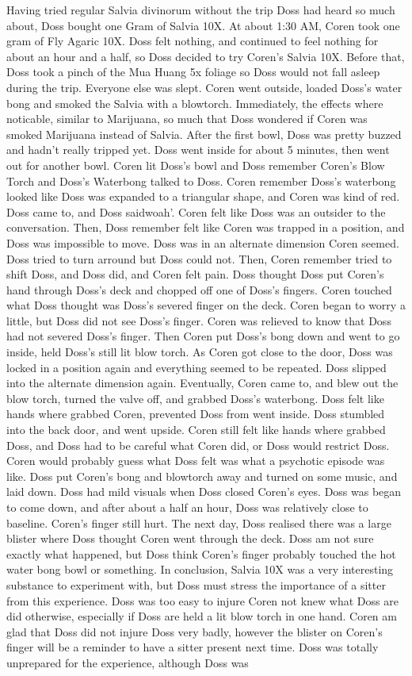 \documentclass[12pt]{book}
\begin{document}
Having tried regular Salvia divinorum without the trip Doss had heard so much about, Doss bought one Gram of Salvia 10X. At about 1:30 AM, Coren took one gram of Fly Agaric 10X. Doss felt nothing, and continued to feel nothing for about an hour and a half, so Doss decided to try Coren's Salvia 10X. Before that, Doss took a pinch of the Mua Huang 5x foliage so Doss would not fall asleep during the trip. Everyone else was slept. Coren went outside, loaded Doss's water bong and smoked the Salvia with a blowtorch. Immediately, the effects where noticable, similar to Marijuana, so much that Doss wondered if Coren was smoked Marijuana instead of Salvia. After the first bowl, Doss was pretty buzzed and hadn't really tripped yet. Doss went inside for about 5 minutes, then went out for another bowl. Coren lit Doss's bowl and Doss remember Coren's Blow Torch and Doss's Waterbong talked to Doss. Coren remember Doss's waterbong looked like Doss was expanded to a triangular shape, and Coren was kind of red. Doss came to, and Doss saidwoah'. Coren felt like Doss was an outsider to the conversation. Then, Doss remember felt like Coren was trapped in a position, and Doss was impossible to move. Doss was in an alternate dimension Coren seemed. Doss tried to turn arround but Doss could not. Then, Coren remember tried to shift Doss, and Doss did, and Coren felt pain. Doss thought Doss put Coren's hand through Doss's deck and chopped off one of Doss's fingers. Coren touched what Doss thought was Doss's severed finger on the deck. Coren began to worry a little, but Doss did not see Doss's finger. Coren was relieved to know that Doss had not severed Doss's finger. Then Coren put Doss's bong down and went to go inside, held Doss's still lit blow torch. As Coren got close to the door, Doss was locked in a position again and everything seemed to be repeated. Doss slipped into the alternate dimension again. Eventually, Coren came to, and blew out the blow torch, turned the valve off, and grabbed Doss's waterbong. Doss felt like hands where grabbed Coren, prevented Doss from went inside. Doss stumbled into the back door, and went upside. Coren still felt like hands where grabbed Doss, and Doss had to be careful what Coren did, or Doss would restrict Doss. Coren would probably guess what Doss felt was what a psychotic episode was like. Doss put Coren's bong and blowtorch away and turned on some music, and laid down. Doss had mild visuals when Doss closed Coren's eyes. Doss was began to come down, and after about a half an hour, Doss was relatively close to baseline. Coren's finger still hurt. The next day, Doss realised there was a large blister where Doss thought Coren went through the deck. Doss am not sure exactly what happened, but Doss think Coren's finger probably touched the hot water bong bowl or something. In conclusion, Salvia 10X was a very interesting substance to experiment with, but Doss must stress the importance of a sitter from this experience. Doss was too easy to injure Coren not knew what Doss are did otherwise, especially if Doss are held a lit blow torch in one hand. Coren am glad that Doss did not injure Doss very badly, however the blister on Coren's finger will be a reminder to have a sitter present next time. Doss was totally unprepared for the experience, although Doss was 
\end{document}

